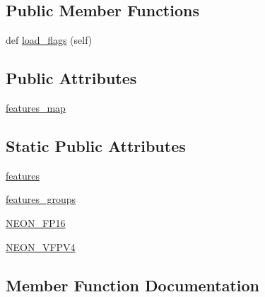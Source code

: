 \subsection*{Public Member Functions}
\begin{DoxyCompactItemize}
\item 
def \hyperlink{classnumpy_1_1core_1_1tests_1_1test__cpu__features_1_1Test__ARM__Features_a576a524243306734215b6a3e4847c1fe}{load\+\_\+flags} (self)
\end{DoxyCompactItemize}
\subsection*{Public Attributes}
\begin{DoxyCompactItemize}
\item 
\hyperlink{classnumpy_1_1core_1_1tests_1_1test__cpu__features_1_1Test__ARM__Features_a7d7e9fac850a996c772133ae48e1fb3e}{features\+\_\+map}
\end{DoxyCompactItemize}
\subsection*{Static Public Attributes}
\begin{DoxyCompactItemize}
\item 
\hyperlink{classnumpy_1_1core_1_1tests_1_1test__cpu__features_1_1Test__ARM__Features_a41b5ea104ce6e68c2930726aa7b4e372}{features}
\item 
\hyperlink{classnumpy_1_1core_1_1tests_1_1test__cpu__features_1_1Test__ARM__Features_a4eec7d54a803f126e67f43a3d519f10d}{features\+\_\+groups}
\item 
\hyperlink{classnumpy_1_1core_1_1tests_1_1test__cpu__features_1_1Test__ARM__Features_a672f870bc03a37efdadd1eb926067fd0}{N\+E\+O\+N\+\_\+\+F\+P16}
\item 
\hyperlink{classnumpy_1_1core_1_1tests_1_1test__cpu__features_1_1Test__ARM__Features_a828b93b0a25b3c28fcc8b0fc60a1b419}{N\+E\+O\+N\+\_\+\+V\+F\+P\+V4}
\end{DoxyCompactItemize}


\subsection{Member Function Documentation}
\mbox{\label{classnumpy_1_1core_1_1tests_1_1test__cpu__features_1_1Test__ARM__Features_a576a524243306734215b6a3e4847c1fe}} 

